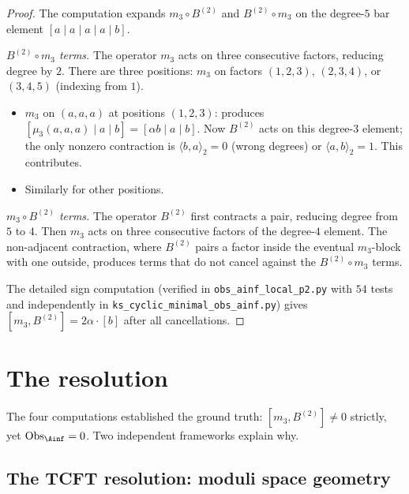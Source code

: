 \begin{proof}
The computation expands $m_3 \circ B^{(2)}$ and $B^{(2)} \circ m_3$
on the degree-$5$ bar element $[a \mid a \mid a \mid a \mid b]$.

\smallskip\noindent\emph{$B^{(2)} \circ m_3$ terms.}
The operator $m_3$ acts on three consecutive factors, reducing
degree by $2$.  There are three positions: $m_3$ on factors
$(1,2,3)$, $(2,3,4)$, or $(3,4,5)$ (indexing from $1$).
\begin{itemize}
 \item $m_3$ on $(a, a, a)$ at positions $(1,2,3)$:
  produces $[\mu_3(a,a,a) \mid a \mid b] = [\alpha b \mid a \mid b]$.
  Now $B^{(2)}$ acts on this degree-$3$ element; the only
  nonzero contraction is $\langle b, a \rangle_2 = 0$
  (wrong degrees) or $\langle a, b \rangle_2 = 1$.  This
  contributes.
 \item Similarly for other positions.
\end{itemize}

\smallskip\noindent\emph{$m_3 \circ B^{(2)}$ terms.}
The operator $B^{(2)}$ first contracts a pair, reducing degree
from $5$ to $4$.  Then $m_3$ acts on three consecutive factors
of the degree-$4$ element.  The non-adjacent contraction, where
$B^{(2)}$ pairs a factor inside the eventual $m_3$-block with
one outside, produces terms that do not cancel against the
$B^{(2)} \circ m_3$ terms.

The detailed sign computation (verified in
\texttt{obs\_ainf\_local\_p2.py} with $54$ tests and
independently in \texttt{ks\_cyclic\_minimal\_obs\_ainf.py})
gives $[m_3, B^{(2)}] = 2\alpha \cdot [b]$ after all
cancellations.
\end{proof}


\section{The resolution}
\label{sec:m3b2-resolution}

The four computations established the ground truth:
$[m_3, B^{(2)}] \neq 0$ strictly, yet $\mathrm{Obs}_{\Ainf} = 0$.
Two independent frameworks explain why.


\subsection{The TCFT resolution: moduli space geometry}
\label{subsec:tcft-resolution}

